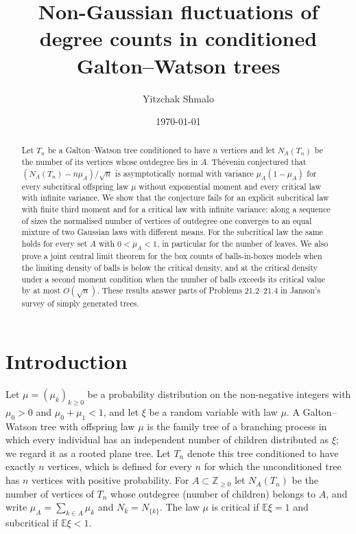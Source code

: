 \documentclass[11pt]{amsart}
\title[Non-Gaussian degree counts in conditioned Galton--Watson trees]{Non-Gaussian fluctuations of degree counts in conditioned Galton--Watson trees}
\author{Yitzchak Shmalo}
\date{\today}
\theoremstyle{definition}
\newcommand{\Z}{\mathbb{Z}}
\newcommand{\E}{\mathbb{E}}
\begin{document}
\begin{abstract}
Let $T_n$ be a Galton--Watson tree conditioned to have $n$ vertices and let $N_A(T_n)$ be the number of its vertices whose outdegree lies in $A$. Th\'evenin conjectured that $(N_A(T_n)-n\mu_A)/\sqrt n$ is asymptotically normal with variance $\mu_A(1-\mu_A)$ for every subcritical offspring law $\mu$ without exponential moment and every critical law with infinite variance. We show that the conjecture fails for an explicit subcritical law with finite third moment and for a critical law with infinite variance: along a sequence of sizes the normalised number of vertices of outdegree one converges to an equal mixture of two Gaussian laws with different means. For the subcritical law the same holds for every set $A$ with $0<\mu_A<1$, in particular for the number of leaves. We also prove a joint central limit theorem for the box counts of balls-in-boxes models when the limiting density of balls is below the critical density, and at the critical density under a second moment condition when the number of balls exceeds its critical value by at most $O(\sqrt n)$. These results answer parts of Problems 21.2--21.4 in Janson's survey of simply generated trees.
\end{abstract}

\maketitle

\section{Introduction}

Let $\mu=(\mu_k)_{k\ge0}$ be a probability distribution on the non-negative integers with $\mu_0>0$ and $\mu_0+\mu_1<1$, and let $\xi$ be a random variable with law $\mu$. A Galton--Watson tree with offspring law $\mu$ is the family tree of a branching process in which every individual has an independent number of children distributed as $\xi$; we regard it as a rooted plane tree. Let $T_n$ denote this tree conditioned to have exactly $n$ vertices, which is defined for every $n$ for which the unconditioned tree has $n$ vertices with positive probability. For $A\subset\Z_{\ge0}$ let $N_A(T_n)$ be the number of vertices of $T_n$ whose outdegree (number of children) belongs to $A$, and write $\mu_A=\sum_{k\in A}\mu_k$ and $N_k=N_{\{k\}}$. The law $\mu$ is critical if $\E\xi=1$ and subcritical if $\E\xi<1$.
\end{document}
